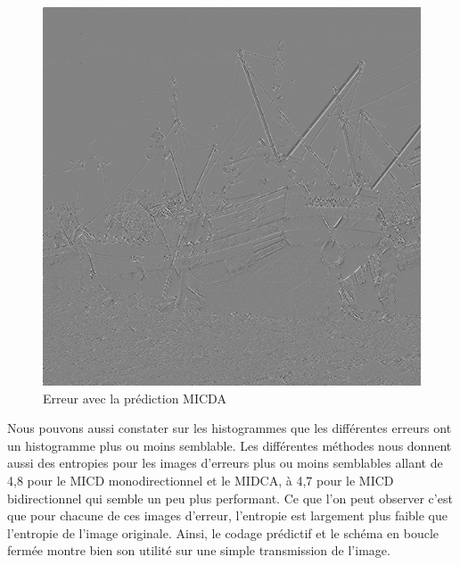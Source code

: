 \documentclass[12pt]{report}
\begin{document}
\begin{figure}[H]
\begin{center}
\includegraphics[scale=0.4]{../ImageRes/ImagecodeeMICDAQ1.jpg} 
\caption{Erreur avec la prédiction MICDA}
\end{center}
\end{figure}

Nous pouvons aussi constater sur les histogrammes que les différentes erreurs ont un histogramme plus ou moins semblable. Les différentes méthodes nous donnent aussi des entropies pour les images d'erreurs plus ou moins semblables allant de 4,8 pour le MICD monodirectionnel et le MIDCA, à 4,7 pour le MICD bidirectionnel qui semble un peu plus performant. Ce que l'on peut observer c'est que pour chacune de ces images d'erreur, l'entropie est largement plus faible que l'entropie de l'image originale. Ainsi, le codage prédictif et le schéma en boucle fermée montre bien son utilité sur une simple transmission de l'image.
\end{document}

